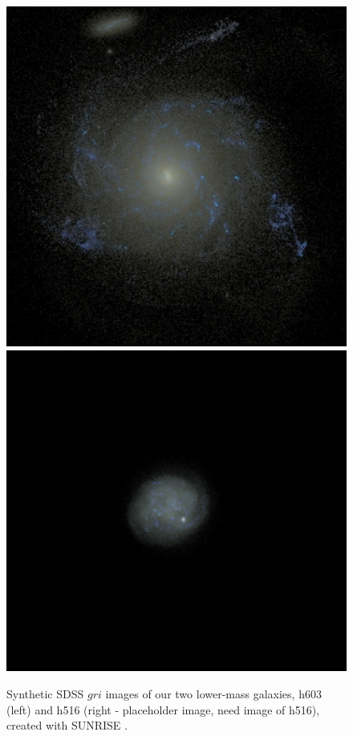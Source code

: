 \documentclass[nofootinbib,twocolumn,prd]{emulateapj}
\begin{document}
\begin{figure}
\includegraphics[width=\columnwidth]{Figures/dwarf1}
\includegraphics[width=\columnwidth]{Figures/h516}
\caption{\label{fig:GalaxyImages}Synthetic SDSS $gri$ images of our two lower-mass galaxies, h603 (left) and h516 (right - placeholder image, need image of h516), created with \textsc{SUNRISE} \citep{Jonsson06}.
\label{fig:dwarfimages}
}
\end{figure}
\end{document}
